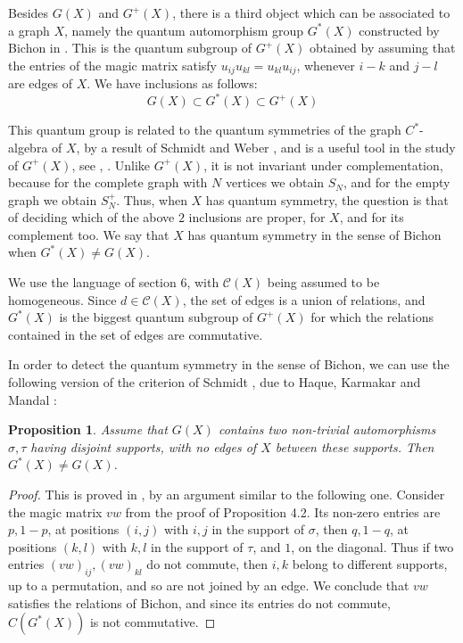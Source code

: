 \documentclass[11pt]{amsart}
\newtheorem{proposition}[theorem]{Proposition}
\newcommand{\C}{\mathcal C}
\begin{document}
Besides $G(X)$ and $G^+(X)$, there is a third object which can be associated to a graph $X$, namely the quantum automorphism group $G^*(X)$ constructed by Bichon in \cite{bi1}. This is the quantum subgroup of $G^+(X)$ obtained by assuming that the entries of the magic matrix satisfy $u_{ij}u_{kl}=u_{kl}u_{ij}$, whenever $i-k$ and $j-l$ are edges of $X$. We have inclusions as follows:
$$G(X)\subset G^*(X)\subset G^+(X)$$

This quantum group is related to the quantum symmetries of the graph $C^*$-algebra of $X$, by a result of Schmidt and Weber \cite{sw}, and is a useful tool in the study of $G^+(X)$, see \cite{scp}, \cite{sc2}. Unlike $G^+(X)$, it is not invariant under complementation, because for the complete graph with $N$ vertices we obtain $S_N$, and for the empty graph we obtain $S_N^+$. Thus, when $X$ has quantum symmetry, the question is that of deciding which of the above $2$ inclusions are proper, for $X$, and for its complement too. We say that $X$ has quantum symmetry in the sense of Bichon when $G^*(X)\neq G(X)$.

We use the language of section 6, with $\C(X)$ being assumed to be homogeneous. Since $d\in\C(X)$, the set of edges is a union of relations, and $G^*(X)$ is the biggest quantum subgroup of $G^+(X)$ for which the relations contained in the set of edges are commutative.

In order to detect the quantum symmetry in the sense of Bichon, we can use the following version of the criterion of Schmidt \cite{sch}, due to Haque, Karmakar and Mandal \cite{hkm}:

\begin{proposition}
Assume that $G(X)$ contains two non-trivial automorphisms $\sigma,\tau$ having disjoint supports, with no edges of $X$ between these supports. Then $G^*(X)\neq G(X)$.
\end{proposition}

\begin{proof}
This is proved in \cite{hkm}, by an argument similar to the following one. Consider the magic matrix $vw$ from the proof of Proposition 4.2. Its non-zero entries are $p,1-p$, at positions $(i,j)$ with $i,j$ in the support of $\sigma$, then $q,1-q$, at positions $(k,l)$ with $k,l$ in the support of $\tau$, and $1$, on the diagonal. Thus if two entries $(vw)_{ij},(vw)_{kl}$ do not commute, then $i,k$ belong to different supports, up to a permutation, and so are not joined by an edge. We conclude that $vw$ satisfies the relations of Bichon, and since its entries do not commute, $C(G^*(X))$ is not commutative.
\end{proof}
\end{document}
